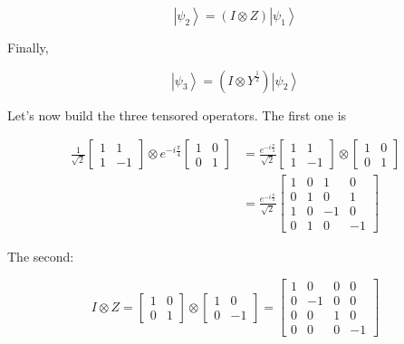 \documentclass[main.tex]{subfiles}
\begin{document}
    $$
    \left|\psi_{2}\right\rangle=(I \otimes Z)\left|\psi_{1}\right\rangle
    $$
    
    Finally,
    
    $$
    \left|\psi_{3}\right\rangle=\left(I \otimes Y^{\frac{1}{2}}\right)\left|\psi_{2}\right\rangle
    $$
    
    Let's now build the three tensored operators. The first one is
    
    $$
    \begin{aligned}
    \frac{1}{\sqrt{2}}\left[\begin{array}{cc}
    1 & 1 \\
    1 & -1
    \end{array}\right] \otimes e^{-i \frac{\pi}{4}}\left[\begin{array}{ll}
    1 & 0 \\
    0 & 1
    \end{array}\right] &=\frac{e^{-i \frac{\pi}{4}}}{\sqrt{2}}\left[\begin{array}{cc}
    1 & 1 \\
    1 & -1
    \end{array}\right] \otimes\left[\begin{array}{ll}
    1 & 0 \\
    0 & 1
    \end{array}\right] \\
    &=\frac{e^{-i \frac{\pi}{4}}}{\sqrt{2}}\left[\begin{array}{cccc}
    1 & 0 & 1 & 0 \\
    0 & 1 & 0 & 1 \\
    1 & 0 & -1 & 0 \\
    0 & 1 & 0 & -1
    \end{array}\right]
    \end{aligned}
    $$
    
    The second:
    
    $$
    I \otimes Z=\left[\begin{array}{ll}
    1 & 0 \\
    0 & 1
    \end{array}\right] \otimes\left[\begin{array}{cc}
    1 & 0 \\
    0 & -1
    \end{array}\right]=\left[\begin{array}{cccc}
    1 & 0 & 0 & 0 \\
    0 & -1 & 0 & 0 \\
    0 & 0 & 1 & 0 \\
    0 & 0 & 0 & -1
    \end{array}\right]
    $$
    
\end{document}
